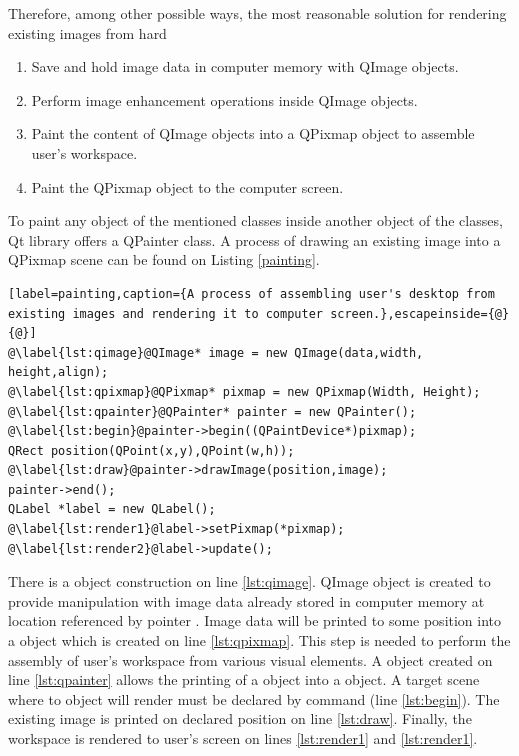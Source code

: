 Therefore, among other possible ways, the most reasonable solution for rendering existing images from hard

\begin{enumerate}
  \item Save and hold image data in computer memory with QImage objects.
  \item Perform image enhancement operations inside QImage objects.
  \item Paint the content of QImage objects into a QPixmap object to assemble user's workspace.
  \item Paint the QPixmap object to the computer screen.
\end{enumerate}

To paint any object of the mentioned classes inside another object of the classes, Qt library offers a QPainter class. A process of drawing an existing image into a QPixmap scene can be found on Listing \ref{painting}.

\begin{lstlisting}[label=painting,caption={A process of assembling user's desktop from existing images and rendering it to computer screen.},escapeinside={@}{@}]
@\label{lst:qimage}@QImage* image = new QImage(data,width, height,align);
@\label{lst:qpixmap}@QPixmap* pixmap = new QPixmap(Width, Height);
@\label{lst:qpainter}@QPainter* painter = new QPainter();
@\label{lst:begin}@painter->begin((QPaintDevice*)pixmap);
QRect position(QPoint(x,y),QPoint(w,h));
@\label{lst:draw}@painter->drawImage(position,image);
painter->end();
QLabel *label = new QLabel();
@\label{lst:render1}@label->setPixmap(*pixmap);
@\label{lst:render2}@label->update();
\end{lstlisting}

There is a  object construction on line \ref{lst:qimage}. QImage object is created to provide manipulation with image data already stored in computer memory at location referenced by pointer . Image data will be printed to some position into a  object which is created on line \ref{lst:qpixmap}. This step is needed to perform the assembly of user's workspace from various visual elements. A  object created on line \ref{lst:qpainter} allows the printing of a  object into a  object. A target scene where to  object will render must be declared by  command (line \ref{lst:begin}). The existing image is printed on declared position on line \ref{lst:draw}. Finally, the workspace is rendered to user's screen on lines \ref{lst:render1} and \ref{lst:render1}.


